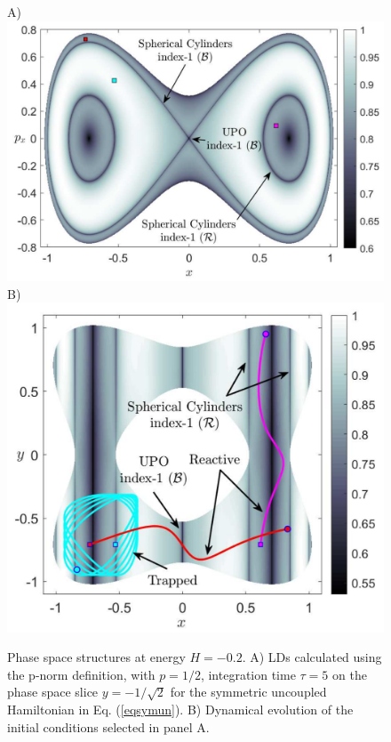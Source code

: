 \documentclass[10pt,aps,onecolumn,superscriptaddress]{revtex4-2}
\begin{document}
\begin{figure}[htbp]
	\begin{center}
		A)\includegraphics[scale=0.26]{LD_tau_5_y_bottSaddle_symmCase}
		B)\includegraphics[scale=0.255]{LD_tau_5_ConfigSp_symmCase}
	\end{center}
	\caption{Phase space structures at energy $H = -0.2$. A) LDs calculated using the p-norm definition, with $p = 1/2$, integration time $\tau = 5$ on the phase space slice $y = -1/\sqrt{2}$ for the symmetric uncoupled Hamiltonian in Eq. (\ref{eqsymun}). B) Dynamical evolution of the initial conditions selected in panel A.}
	\label{LD_sym_h_neg}
\end{figure}
\end{document}
